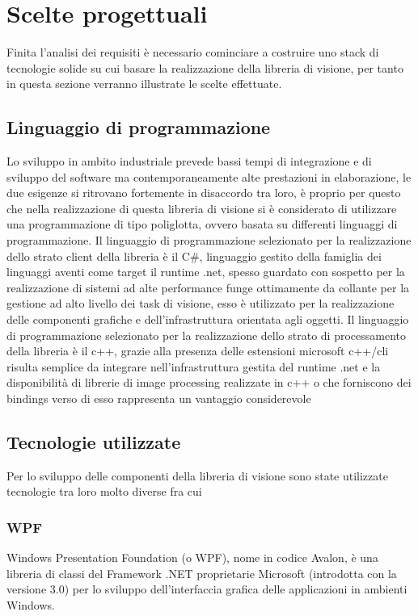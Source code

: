 \section{Scelte progettuali}
\label{sec:scelte-progettuali}

Finita l'analisi dei requisiti è necessario cominciare a costruire uno stack di tecnologie solide su cui basare la realizzazione della libreria di visione, per tanto in questa sezione verranno illustrate le scelte effettuate.

\subsection{Linguaggio di programmazione}

Lo sviluppo in ambito industriale prevede bassi tempi di integrazione e di sviluppo del software ma contemporaneamente alte prestazioni in elaborazione, le due esigenze si ritrovano fortemente in disaccordo tra loro, è proprio per questo che nella realizzazione di questa libreria di visione si è considerato di utilizzare una programmazione di tipo poliglotta, ovvero basata su differenti linguaggi di programmazione.
Il linguaggio di programmazione selezionato per la realizzazione dello strato client della libreria è il C\#, linguaggio gestito della famiglia dei linguaggi aventi come target il runtime .net, spesso guardato con sospetto per la realizzazione di sistemi ad alte performance funge ottimamente da collante per la gestione ad alto livello dei task di visione, esso è utilizzato per la realizzazione delle componenti grafiche e dell'infrastruttura orientata agli oggetti.
Il linguaggio di programmazione selezionato per la realizzazione dello strato di processamento della libreria è il c++, grazie alla presenza delle estensioni microsoft c++/cli risulta semplice da integrare nell'infrastruttura gestita del runtime .net e la disponibilità di librerie di image processing realizzate in c++ o che forniscono dei bindings verso di esso rappresenta un vantaggio considerevole

\subsection{Tecnologie utilizzate}

Per lo sviluppo delle componenti della libreria di visione sono state utilizzate tecnologie tra loro molto diverse fra cui

\subsubsection{WPF}
Windows Presentation Foundation (o WPF), nome in codice Avalon, è una libreria di classi del Framework .NET proprietarie Microsoft (introdotta con la versione 3.0) per lo sviluppo dell'interfaccia grafica delle applicazioni in ambienti Windows.

